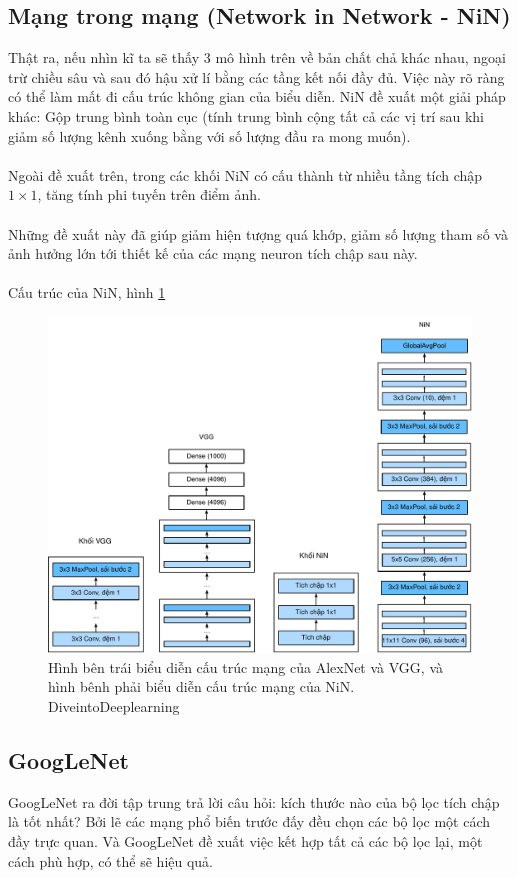 \documentclass{article}
\begin{document}
\subsection{Mạng trong mạng (Network in Network - NiN)}
Thật ra, nếu nhìn kĩ ta sẽ thấy 3 mô hình trên về bản chất chả khác nhau, ngoại trừ chiều sâu và sau đó hậu xử lí bằng các tầng kết nối đầy đủ. Việc này rõ ràng có thể làm mất đi cấu trúc không gian của biểu diễn. NiN đề xuất một giải pháp khác: Gộp trung bình toàn cục (tính trung bình cộng tất cả các vị trí sau khi giảm số lượng kênh xuống bằng với số lượng đầu ra mong muốn).\\\\
Ngoài đề xuất trên, trong các khối NiN có cấu thành từ nhiều tầng tích chập $1 \times 1$, tăng tính phi tuyến trên điểm ảnh.\\\\
Những đề xuất này đã giúp giảm hiện tượng quá khớp, giảm số lượng tham số và ảnh hưởng lớn tới thiết kế của các mạng neuron tích chập sau này.
\\\\
Cấu trúc của NiN, hình \ref{fig11}
\begin{figure}[ht!]
    \centering
    \includegraphics[width = 0.8\linewidth]{nin.pdf}
    \caption{Hình bên trái biểu diễn cấu trúc mạng của AlexNet và VGG, và hình bênh phải biểu diễn cấu trúc mạng của NiN. DiveintoDeeplearning}
    \label{fig11}
\end{figure}
\subsection{GoogLeNet}
GoogLeNet ra đời tập trung trả lời câu hỏi: kích thước nào của bộ lọc tích chập là tốt nhất? Bởi lẽ các mạng phổ biến trước đấy đều chọn các bộ lọc một cách đầy trực quan. Và GoogLeNet đề xuất việc kết hợp tất cả các bộ lọc lại, một cách phù hợp, có thể sẽ hiệu quả. 
\end{document}
